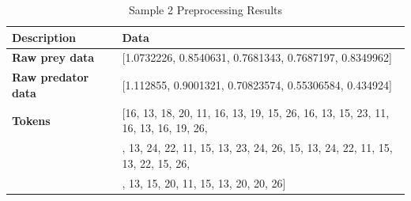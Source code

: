 \documentclass{article}
\begin{document}
\begin{table}[ht]
  \centering
  \caption{Sample 2 Preprocessing Results}
  \begin{tabular}{>{\bfseries}l l}
    \toprule
    Description & Data \\
    \midrule
    Raw prey data & [1.0732226, 0.8540631, 0.7681343, 0.7687197, 0.8349962] \\
    Raw predator data\ & [1.112855, 0.9001321, 0.70823574, 0.55306584, 0.434924] \\
    Tokens & [16, 13, 18, 20, 11, 16, 13, 19, 15, 26, 16, 13, 15, 23, 11, 16, 13, 16, 19, 26,\\ 
                & \quad 15, 13, 24, 22, 11, 15, 13, 23, 24, 26, 15, 13, 24, 22, 11, 15, 13, 22, 15, 26,\\ 
                & \quad 16, 13, 15, 20, 11, 15, 13, 20, 20, 26] \\
    \bottomrule
  \end{tabular}
\end{table}




\end{document}
